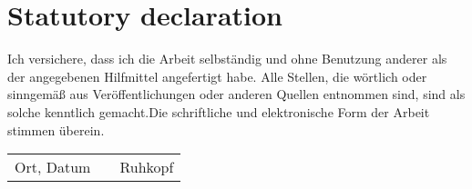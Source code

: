 \documentclass[11pt]{article}
\begin{document}
    \clearpage
    \section{Statutory declaration}
    Ich versichere, dass ich die Arbeit selbst\"andig und ohne Benutzung anderer als der angegebenen Hilfmittel angefertigt habe. Alle Stellen, die w\"ortlich oder sinngem\"a\ss{} aus Ver\"offentlichungen oder anderen Quellen entnommen sind, sind als solche kenntlich gemacht.Die schriftliche und elektronische Form der Arbeit stimmen \"uberein.

       \vspace{2.5cm}

\begin{tabular}{p{}cp{}}
  \cline{0-0} \cline{3-3} \\
  Ort, Datum & & Ruhkopf
\end{tabular}
\end{document}
